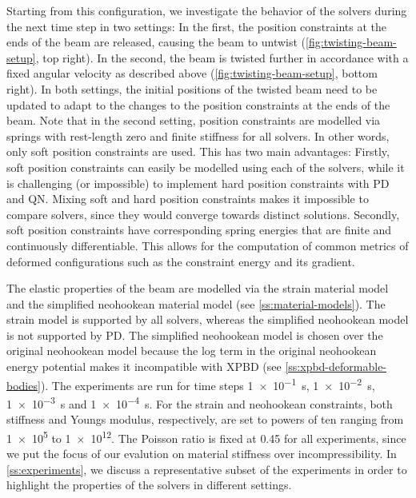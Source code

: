 Starting from this configuration, we investigate the behavior of the 
solvers during the next time step in two settings: In the first, the position constraints at the ends of the beam are released, causing the 
beam to untwist (\cref{fig:twisting-beam-setup}, top right). In the second, the beam is twisted further in accordance with a fixed angular
velocity as described above (\cref{fig:twisting-beam-setup}, bottom right). In both settings, the initial positions of the twisted beam 
need to be updated to adapt to the changes to 
the position constraints at the ends of the beam. Note that in the second setting, position constraints are modelled 
via springs with rest-length zero and finite stiffness for all solvers. In other words, only soft position constraints are used. This has two main advantages:
Firstly, soft position constraints can easily be modelled using each of the solvers, while it is challenging (or impossible) to 
implement hard position constraints with PD and QN. Mixing soft and hard position constraints makes it impossible to compare solvers,
since they would converge towards distinct solutions. Secondly, soft position constraints have corresponding spring energies that are 
finite and continuously differentiable. This allows for the computation of common metrics of deformed configurations such as the constraint 
energy and its gradient. 

The elastic properties of the beam are modelled via the strain material model and the simplified neohookean 
material model (see \cref{ss:material-models}). The strain model is supported by all solvers, whereas the simplified neohookean model is 
not supported by PD. The simplified neohookean model is chosen over the original neohookean model because the log term in the original 
neohookean energy potential makes it incompatible with XPBD (see \cref{ss:xpbd-deformable-bodies}). The experiments are run for time steps 
\SI{1e-1}{\second}, \SI{1e-2}{\second}, \SI{1e-3}{\second} and \SI{1e-4}{\second}. For the strain and neohookean constraints, both 
stiffness and Youngs modulus, respectively, are set to powers of ten ranging from \num{1e5} to \num{1e12}. The Poisson ratio is fixed 
at 0.45 for all experiments, since we put the focus of our evalution on material stiffness over incompressibility. In \autoref{ss:experiments}, 
we discuss a representative subset of the experiments in order to highlight the properties of the solvers 
in different settings.

